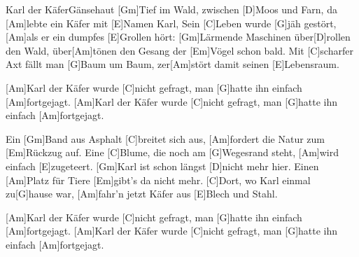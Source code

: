 \documentclass[../main.tex]{subfiles}
\begin{document}
\begin{song}{Karl der Käfer}{Gänsehaut}{}
[Gm]Tief im Wald, zwischen [D]Moos und Farn, da [Am]lebte ein Käfer mit [E]Namen Karl,
Sein [C]Leben wurde [G]jäh gestört, [Am]als er ein dumpfes [E]Grollen hört:
[Gm]Lärmende Maschinen über[D]rollen den Wald, über[Am]tönen den Gesang der [Em]Vögel schon bald.
Mit [C]scharfer Axt fällt man [G]Baum um Baum, zer[Am]stört damit seinen [E]Lebensraum.

[Am]Karl der Käfer wurde [C]nicht gefragt, man [G]hatte ihn einfach [Am]fortgejagt.
[Am]Karl der Käfer wurde [C]nicht gefragt, man [G]hatte ihn einfach [Am]fortgejagt.

Ein [Gm]Band aus Asphalt [C]breitet sich aus, [Am]fordert die Natur zum [Em]Rückzug auf.
Eine [C]Blume, die noch am [G]Wegesrand steht, [Am]wird einfach [E]zugeteert.
[Gm]Karl ist schon längst [D]nicht mehr hier. Einen [Am]Platz für Tiere [Em]gibt's da nicht mehr.
[C]Dort, wo Karl einmal zu[G]hause war, [Am]fahr'n jetzt Käfer aus [E]Blech und Stahl.

[Am]Karl der Käfer wurde [C]nicht gefragt, man [G]hatte ihn einfach [Am]fortgejagt.
[Am]Karl der Käfer wurde [C]nicht gefragt, man [G]hatte ihn einfach [Am]fortgejagt.
\end{song}
\end{document}
